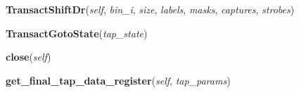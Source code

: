     \vspace{0.5ex}

\hspace{.8\funcindent}\begin{boxedminipage}{\funcwidth}

    \raggedright \textbf{TransactShiftDr}(\textit{self}, \textit{bin\_i}, \textit{size}, \textit{labels}, \textit{masks}, \textit{captures}, \textit{strobes})

\setlength{\parskip}{2ex}
\setlength{\parskip}{1ex}
    \end{boxedminipage}

    \label{hpl_tap_engine:HplTapEngine:TransactGotoState}

    \vspace{0.5ex}

\hspace{.8\funcindent}\begin{boxedminipage}{\funcwidth}

    \raggedright \textbf{TransactGotoState}(\textit{tap\_state})

\setlength{\parskip}{2ex}
\setlength{\parskip}{1ex}
    \end{boxedminipage}

    \label{hpl_tap_engine:HplTapEngine:close}

    \vspace{0.5ex}

\hspace{.8\funcindent}\begin{boxedminipage}{\funcwidth}

    \raggedright \textbf{close}(\textit{self})

\setlength{\parskip}{2ex}
\setlength{\parskip}{1ex}
    \end{boxedminipage}

    \label{hpl_tap_engine:HplTapEngine:get_final_tap_data_register}

    \vspace{0.5ex}

\hspace{.8\funcindent}\begin{boxedminipage}{\funcwidth}

    \raggedright \textbf{get\_final\_tap\_data\_register}(\textit{self}, \textit{tap\_params})

\setlength{\parskip}{2ex}
\setlength{\parskip}{1ex}
    \end{boxedminipage}

